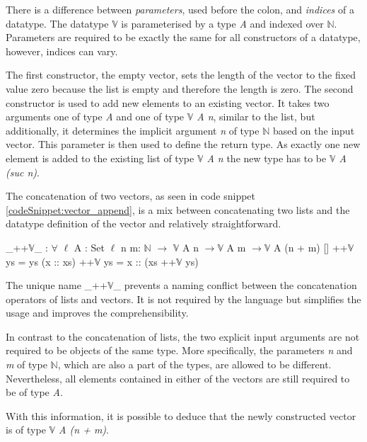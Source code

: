 There is a difference between \emph{parameters}, used before the colon, and \emph{indices} of a datatype.
The datatype $\mathbb{V}$ is parameterised by a type \emph{A} and indexed over $\mathbb{N}$\cite{norell:deptyped}.
Parameters are required to be exactly the same for all constructors of a datatype, however, indices can vary.

The first constructor, the empty vector, sets the length of the vector to the fixed value zero because the list is empty and therefore the length is zero.
The second constructor is used to add new elements to an existing vector. It takes two arguments one of type \emph{A} and one of type \emph{$\mathbb{V}$ A n}, similar to the list, but additionally, it determines the implicit argument \emph{n} of type $\mathbb{N}$ based on the input vector.
This parameter is then used to define the return type. As exactly one new element is added to the existing list of type \emph{$\mathbb{V}$ A n} the new type has to be \emph{$\mathbb{V}$ A (suc n)}.

The concatenation of two vectors, as seen in code snippet \ref{codeSnippet:vector_append}, is a mix between concatenating two lists and the datatype definition of the vector and relatively straightforward.

\begin{codesnippet}[mathescape=true, caption={Definition of the vector concatenation function in Agda}, label={codeSnippet:vector_append}]
_++$\mathbb{V}$_ : $\forall$ {$\ell$} {A : Set $\ell$}  {n m: $\mathbb{N}$} $\rightarrow$
        $\mathbb{V}$ A n $\rightarrow \mathbb{V}$ A m $\rightarrow \mathbb{V}$ A (n + m)
  []        ++$\mathbb{V}$ ys = ys
  (x :: xs) ++$\mathbb{V}$ ys = x :: (xs ++$\mathbb{V}$ ys)
\end{codesnippet}
The unique name \_++$\mathbb{V}$\_ prevents a naming conflict between the concatenation operators of lists and vectors.
It is not required by the language but simplifies the usage and improves the comprehensibility.

In contrast to the concatenation of lists, the two explicit input arguments are not required to be objects of the same type.
More specifically, the parameters \emph{n} and \emph{m} of type $\mathbb{N}$, which are also a part of the types, are allowed to be different. 
Nevertheless, all elements contained in either of the vectors are still required to be of type \emph{A}.

With this information, it is possible to deduce that the newly constructed vector is of type \emph{$\mathbb{V}$ A (n + m)}.

